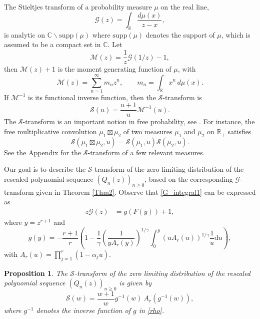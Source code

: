 \documentclass[12pt]{article}
\newcommand{\St}{\mathcal{S}} %
\newcommand{\Gt}{\mathcal{G}} %
\newcommand{\Mt}{\mathcal{M}} %
\newtheorem{proposition}{Proposition}[section]
\numberwithin{equation}{section}
\begin{document}


The Stieltjes transform of a probability measure $\mu$ on the real line, 
\[    \Gt(z) = \int_\mathbb{R} \frac{d\mu(x)}{z-x},  \]
is analytic on $\mathbb{C}\backslash \mathrm{supp}(\mu)$  where  $\mathrm{supp}(\mu)$ denotes the support of $\mu$, which   is assumed to be a compact set in $\mathbb{C}$. Let 
\[   \Mt(z) = \frac{1}{z} \Gt(1/z) - 1, \]
then $\Mt(z)+1$ is the moment generating function of $\mu$, with 
\[    \Mt(z) = \sum_{n=1}^\infty m_n z^n, \qquad   m_n = \int_\mathbb{R} x^n\, d\mu(x).  \]
If $\Mt^{-1}$ is its functional inverse function, then the $\St$-transform is
\[   \St(u) = \frac{u+1}{u} \Mt^{-1}(u).  \]
The $\St$-transform is an important notion in free probability, see \cite{MingoSpeicher} \cite{Voiculescu}. For instance, the free multiplicative
convolution $\mu_1 \boxtimes\mu_2$ of two measures $\mu_1$ and $\mu_2$ on $\mathbb{R}_+$  satisfies
\[   \St(\mu_1 \boxtimes \mu_2,u) = \St(\mu_1,u) \St(\mu_2,u).  \]
See the Appendix for the $\St$-transform of a few relevant measures.


Our goal is to describe the \(\St\)-transform of the zero limiting distribution of the rescaled polynomial sequence \((Q_n(z))_{n\geq 0}\), based on the corresponding \(\Gt\)-transform given in Theorem \ref{Thm2}. Observe that \eqref{G_integral1} can be expressed as 
\begin{align}\label{zG}
	z\Gt (z)&
	=   g(F(y)) +1 , 
\end{align}
where \(y=z^{r+1}\) and 
\begin{equation}\label{rho}
	g(y)= -\frac{r+1}{r}\left( 1-  \frac{1}{\gamma} \left(\frac{1}{yA_r(y)}\right)^{1/\gamma}
		\int_0^{y} \left(uA_r(u)\right)^{1/\gamma} \frac{1}{u}	\mathrm{d}u  \right), 
\end{equation}
with $A_r(u) = \prod_{j=1}^r (1-\alpha_j u)$.  

\begin{proposition}\label{PropFree} The $\St$-transform of the zero limiting distribution of the rescaled polynomial sequence \((Q_n(z))_{n\geq 0}\) is given by 
\begin{equation}\label{St}
	\St (w)= \frac{w+1}{w}  g^{-1} (w) \ A_r(g^{-1} (w)) , 
\end{equation}
where \(g^{-1}\) denotes the inverse function of  \(g\) in \eqref{rho}. 
\end{proposition}
\end{document}
